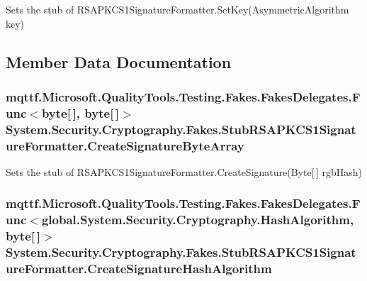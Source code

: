 Sets the stub of R\-S\-A\-P\-K\-C\-S1\-Signature\-Formatter.\-Set\-Key(\-Asymmetric\-Algorithm key)



\subsection{Member Data Documentation}
\hypertarget{class_system_1_1_security_1_1_cryptography_1_1_fakes_1_1_stub_r_s_a_p_k_c_s1_signature_formatter_a4fdfd42f22de38b5e3ea044ec3305268}{
\subsubsection[{Create\-Signature\-Byte\-Array}]{\setlength{\rightskip}{0pt plus 5cm}mqttf.\-Microsoft.\-Quality\-Tools.\-Testing.\-Fakes.\-Fakes\-Delegates.\-Func$<$byte\mbox{[}$\,$\mbox{]}, byte\mbox{[}$\,$\mbox{]}$>$ System.\-Security.\-Cryptography.\-Fakes.\-Stub\-R\-S\-A\-P\-K\-C\-S1\-Signature\-Formatter.\-Create\-Signature\-Byte\-Array}}\label{class_system_1_1_security_1_1_cryptography_1_1_fakes_1_1_stub_r_s_a_p_k_c_s1_signature_formatter_a4fdfd42f22de38b5e3ea044ec3305268}


Sets the stub of R\-S\-A\-P\-K\-C\-S1\-Signature\-Formatter.\-Create\-Signature(\-Byte\mbox{[}$\,$\mbox{]} rgb\-Hash)

\hypertarget{class_system_1_1_security_1_1_cryptography_1_1_fakes_1_1_stub_r_s_a_p_k_c_s1_signature_formatter_acd83fd68b7affbeaf29f2be89d8c8f63}{
\subsubsection[{Create\-Signature\-Hash\-Algorithm}]{\setlength{\rightskip}{0pt plus 5cm}mqttf.\-Microsoft.\-Quality\-Tools.\-Testing.\-Fakes.\-Fakes\-Delegates.\-Func$<$global.\-System.\-Security.\-Cryptography.\-Hash\-Algorithm, byte\mbox{[}$\,$\mbox{]}$>$ System.\-Security.\-Cryptography.\-Fakes.\-Stub\-R\-S\-A\-P\-K\-C\-S1\-Signature\-Formatter.\-Create\-Signature\-Hash\-Algorithm}}\label{class_system_1_1_security_1_1_cryptography_1_1_fakes_1_1_stub_r_s_a_p_k_c_s1_signature_formatter_acd83fd68b7affbeaf29f2be89d8c8f63}


